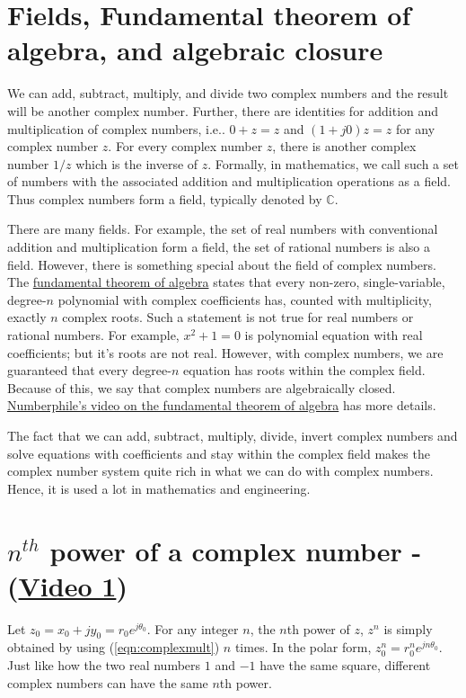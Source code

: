 \section{Fields, Fundamental theorem of algebra, and algebraic closure}
\label{sec:algebraicclosure}
We can add, subtract, multiply, and divide two complex numbers and the result will be another complex number. Further, there are identities for addition and multiplication of complex numbers, i.e.. $0+z = z$ and $(1+j0) z = z$ for any complex number $z$. For every complex number $z$,
there is another complex number $1/z$ which is the inverse of $z$. Formally, in mathematics, we call such a set of numbers with the associated addition and multiplication operations as a field. Thus complex numbers form a field, typically denoted by
$\mathbb{C}$.

There are many fields. For example, the set of real numbers with conventional addition and multiplication form a field, the set of rational numbers is also a field.
However, there is something special about the field of complex numbers.
The \href{https://en.wikipedia.org/wiki/Fundamental_theorem_of_algebra}{fundamental theorem of algebra} states that every non-zero, single-variable, degree-$n$ polynomial with complex coefficients has, counted with multiplicity, exactly $n$ complex roots.
Such a statement is not true for real numbers or rational numbers. For example,
$x^2+1 = 0$ is polynomial equation with real coefficients; but it's roots are not real.
However, with complex numbers, we are guaranteed that every degree-$n$ equation has roots
within the complex field. Because of this, we say that complex numbers are algebraically closed. \href{https://www.youtube.com/watch?v=shEk8sz1oOw}{Numberphile's video on the fundamental theorem of algebra} has more details.

The fact that we can add, subtract, multiply, divide, invert complex numbers and solve equations with coefficients and stay within the complex field makes the complex number system quite rich in what we can do with complex numbers. Hence, it is used a lot in mathematics and engineering.


\section{$n^{th}$ power of a complex number - (\href{https://youtu.be/um6i6G5WaU8}{Video 1})}
\label{sec:nthpower}

Let $z_0 = x_0 + j y_0 = r_0  e^{j \theta_0}$. For any integer $n$, the $n$th power of $z$, $z^n$ is simply obtained by
using (\ref{eqn:complexmult}) $n$ times. In the polar form, $z_0^n = r_0^n e^{j n \theta_0}$. Just like how the two real
numbers $1$ and $-1$ have the same square, different complex numbers can have the same $n$th power.

